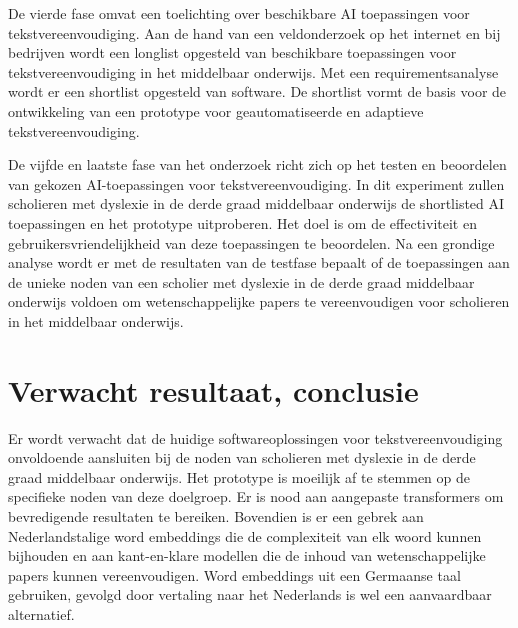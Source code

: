 De vierde fase omvat een toelichting over beschikbare AI toepassingen voor tekstvereenvoudiging. Aan de hand van een veldonderzoek op het internet en bij bedrijven wordt een longlist opgesteld van beschikbare toepassingen voor tekstvereenvoudiging in het middelbaar onderwijs. Met een requirementsanalyse wordt er een shortlist opgesteld van software. De shortlist vormt de basis voor de ontwikkeling van een prototype voor geautomatiseerde en adaptieve tekstvereenvoudiging.



De vijfde en laatste fase van het onderzoek richt zich op het testen en beoordelen van gekozen AI-toepassingen voor tekstvereenvoudiging. In dit experiment zullen scholieren met dyslexie in de derde graad middelbaar onderwijs de shortlisted AI toepassingen en het prototype uitproberen. Het doel is om de effectiviteit en gebruikersvriendelijkheid van deze toepassingen te beoordelen. Na een grondige analyse wordt er met de resultaten van de testfase bepaalt of de toepassingen aan de unieke noden van een scholier met dyslexie in de derde graad middelbaar onderwijs voldoen om wetenschappelijke papers te vereenvoudigen voor scholieren in het middelbaar onderwijs.

% 

\section{Verwacht resultaat, conclusie}
\label{sec:verwachte_resultaten}


Er wordt verwacht dat de huidige softwareoplossingen voor tekstvereenvoudiging onvoldoende aansluiten bij de noden van scholieren met dyslexie in de derde graad middelbaar onderwijs. Het prototype is moeilijk af te stemmen op de specifieke noden van deze doelgroep. Er is nood aan aangepaste transformers om bevredigende resultaten te bereiken. Bovendien is er een gebrek aan Nederlandstalige word embeddings die de complexiteit van elk woord kunnen bijhouden en aan kant-en-klare modellen die de inhoud van wetenschappelijke papers kunnen vereenvoudigen. Word embeddings uit een Germaanse taal gebruiken, gevolgd door vertaling naar het Nederlands is wel een aanvaardbaar alternatief. 


